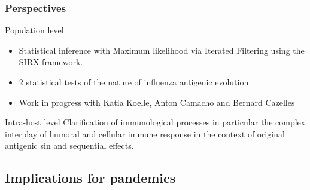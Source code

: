 \documentclass{beamer}
\begin{document}
\begin{frame}
  \frametitle{Perspectives}

  \begin{block}{Population level}
    \begin{itemize}
    \item Statistical inference with \alert{Maximum likelihood via Iterated
        Filtering} using the SIRX framework.
    \item 2 statistical tests of the nature of influenza antigenic
      evolution
    \item Work in progress with Katia Koelle, Anton Camacho and
      Bernard Cazelles
    \end{itemize}
  \end{block}

\pause

\begin{alertblock}{Intra-host level}
  Clarification of immunological processes in particular the complex
  interplay of humoral and cellular immune response in the context of
  original antigenic sin and sequential effects.
\end{alertblock}

\end{frame}



\subsection{Implications for pandemics}
\end{document}
